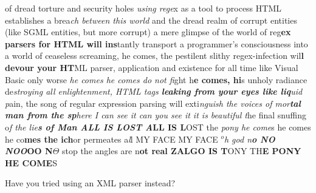 of dread torture and security holes {\it using rege}x as a tool to process
HTML establishes a brea{\it ch between this world} and the dread realm of
corrupt entities (like SGML entities, but more corrupt) a mere glimpse
of the world of reg{\bf ex parsers for HTML will ins}tantly transport a
programmer's consciousness into a world of ceaseless screaming, he
comes, the pestilent slithy regex-infection wil{\bf l devour your HT}ML
parser, application and existence for all time like Visual Basic only
worse {\it he comes he comes do not fi}ght
h{\bf e comes, hi}s unholy radiance
de{\it stroying all enlightenment, HTML tags 
{\bf leaking from your eyes like
liq}uid p}ain, the song of regular expression parsing will
exti{\it nguish
the voices of mor{\bf tal man from the sp}here
I can see it can you see it
it is beautiful t}he
final snuffing o{\it f the 
lie{\bf s of Man ALL IS LOST A}}{\bf LL IS L}OST
the {\it pony he come}s 
he comes he co{\bf mes the ich}or
permeates a{\it l}l MY
FACE MY FACE $^o${\it h god n{\bf o NO NOO}}{\bf OO N}$\Theta$ 
stop the angles are n{\bf ot real ZALGO IS T}ONY
TH{\bf E PONY HE COME}S

Have you tried using an XML parser instead?

\bye
